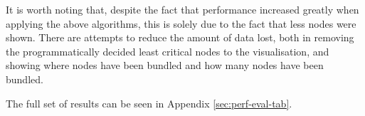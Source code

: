 \documentclass[../dissertation.tex]{subfiles}
\begin{document}
It is worth noting that, despite the fact that performance increased greatly when applying the above algorithms, this is solely due to the fact that less nodes were shown. There are attempts to reduce the amount of data lost, both in removing the programmatically decided least critical nodes to the visualisation, and showing where nodes have been bundled and how many nodes have been bundled.

The full set of results can be seen in Appendix \ref{sec:perf-eval-tab}.
\end{document}
